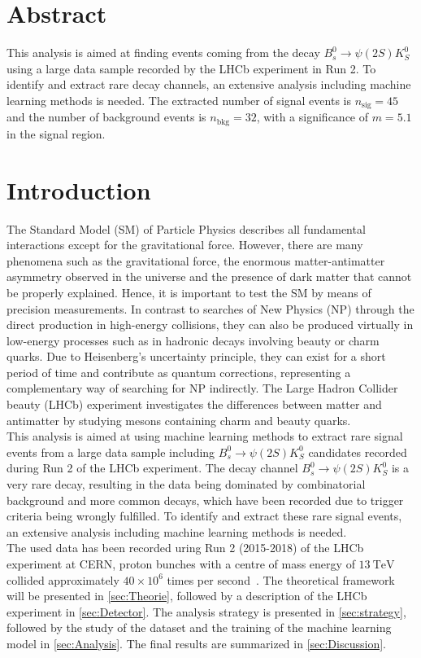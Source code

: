 \section{Abstract}

This analysis is aimed at finding events coming from the decay $B_s^0 \to \psi (2S)K_S^0$ using a large data sample recorded by the LHCb experiment in Run 2. 
To identify and extract rare decay channels, an extensive analysis including machine learning methods is needed.
The extracted number of signal events is $n_\text{sig} = \num{45}$ and the number of background events is $n_\text{bkg} = \num{32}$, with a significance of $m = \num{5.1}$ in the signal region.

\section{Introduction}
The Standard Model (SM) of Particle Physics describes all fundamental interactions except for the gravitational force.
However, there are many phenomena such as the gravitational force, the enormous matter-antimatter asymmetry observed in the universe and the presence of
dark matter that cannot be properly explained. Hence, it is important to test the SM by means of precision measurements. In contrast to searches of New Physics (NP) through the
direct production in high-energy collisions, they can also be produced virtually in low-energy processes such as in hadronic decays involving beauty or charm quarks. Due to Heisenberg's uncertainty
principle, they can exist for a short period of time and contribute as quantum corrections, representing a complementary way of searching for NP indirectly. The Large Hadron Collider beauty (LHCb)
experiment investigates the differences between matter and antimatter by studying mesons containing charm and beauty quarks.\\
This analysis is aimed at using machine learning methods to extract rare signal events from a large data sample including $B_s^0 \to \psi (2S)K_S^0$ candidates recorded during Run 2 of the LHCb experiment. The decay 
channel $B_s^0 \to \psi (2S)K_S^0$ is a very rare decay, resulting in the data being dominated by combinatorial background and more common decays, which have been recorded due to trigger criteria being wrongly fulfilled.
To identify and extract these rare signal events, an extensive analysis including machine learning methods is needed.\\
The used data has been recorded uring Run 2 (2015-2018) of the LHCb experiment at CERN, proton bunches with a centre of mass energy of $\qty{13}{\tera\electronvolt}$ collided approximately $40 \times 10^6$ times per second~\cite{LHCb_MVA}.
The theoretical framework will be presented in \autoref{sec:Theorie}, followed by a description of the LHCb experiment in \autoref{sec:Detector}. The analysis strategy is presented in \autoref{sec:strategy}, followed by
the study of the dataset and the training of the machine learning model in \autoref{sec:Analysis}. The final results are summarized in \autoref{sec:Discussion}.
\newpage
